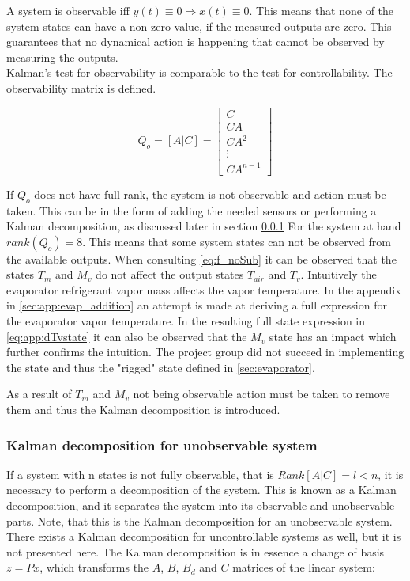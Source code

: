 \noindent A system is observable iff $y(t) \equiv 0 \Rightarrow x(t) \equiv 0$. This means that none of the system states can have a non-zero value, if the measured outputs are zero. This guarantees that no dynamical action is happening that cannot be observed by measuring the outputs.\\

Kalman's test for observability is comparable to the test for controllability. The observability matrix is defined.

\begin{equation}
	Q_o = [A|C] = \begin{bmatrix}
		C \\ CA \\ CA^2 \\ \vdots \\ CA^{n-1}
	\end{bmatrix}
\end{equation}

If $Q_o$ does not have full rank, the system is not observable and action must be taken. This can be in the form of adding the needed sensors or performing a Kalman decomposition, as discussed later in section \cref{sec:kalman}
For the system at hand $ rank(Q_o) = 8 $. This means that some system states can not be observed from the available outputs. When consulting \cref{eq:f_noSub} it can be observed that the states $T_m$ and $M_v$ do not affect the output states $T_{air}$ and $T_v$. Intuitively the evaporator refrigerant vapor mass affects the vapor temperature. In the appendix in \cref{sec:app:evap_addition} an attempt is made at deriving a full expression for the evaporator vapor temperature. In the resulting full state expression in \cref{eq:app:dTvstate} it can also be observed that the $M_v$ state has an impact which further confirms the intuition. The project group did not succeed in implementing the state and thus the "rigged" state defined in \cref{sec:evaporator}.

As a result of $T_m$ and $M_v$ not being observable action must be taken to remove them and thus the Kalman decomposition is introduced.

\subsubsection{Kalman decomposition for unobservable system} \label{sec:kalman}
If a system with n states is not fully observable, that is $Rank[A|C] = l < n$, it is necessary to perform a decomposition of the system. This is known as a Kalman decomposition, and it separates the system into its observable and unobservable parts. Note, that this is the Kalman decomposition for an unobservable system. There exists a Kalman decomposition for uncontrollable systems as well, but it is not presented here. The Kalman decomposition is in essence a change of basis $z=Px$, which transforms the $A$, $B$, $B_d$ and $C$ matrices of the linear system:

